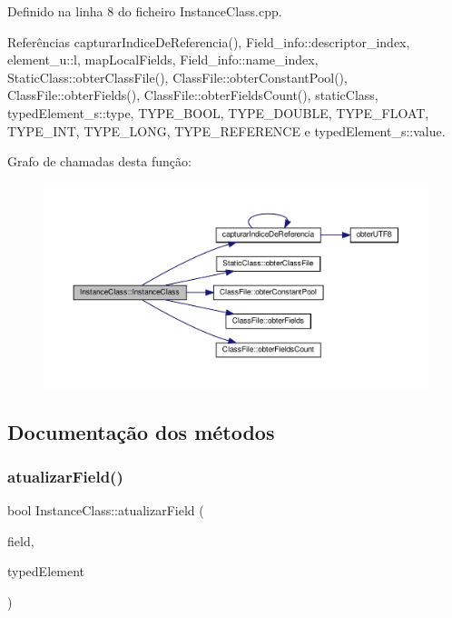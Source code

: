 Definido na linha 8 do ficheiro Instance\+Class.\+cpp.



Referências capturar\+Indice\+De\+Referencia(), Field\+\_\+info\+::descriptor\+\_\+index, element\+\_\+u\+::l, map\+Local\+Fields, Field\+\_\+info\+::name\+\_\+index, Static\+Class\+::obter\+Class\+File(), Class\+File\+::obter\+Constant\+Pool(), Class\+File\+::obter\+Fields(), Class\+File\+::obter\+Fields\+Count(), static\+Class, typed\+Element\+\_\+s\+::type, T\+Y\+P\+E\+\_\+\+B\+O\+OL, T\+Y\+P\+E\+\_\+\+D\+O\+U\+B\+LE, T\+Y\+P\+E\+\_\+\+F\+L\+O\+AT, T\+Y\+P\+E\+\_\+\+I\+NT, T\+Y\+P\+E\+\_\+\+L\+O\+NG, T\+Y\+P\+E\+\_\+\+R\+E\+F\+E\+R\+E\+N\+CE e typed\+Element\+\_\+s\+::value.

Grafo de chamadas desta função\+:
\nopagebreak
\begin{figure}[H]
\begin{center}
\leavevmode
\includegraphics[width=350pt]{classInstanceClass_ac1bee1eb9725e1fec8de7f4cf97f369c_cgraph}
\end{center}
\end{figure}


\subsection{Documentação dos métodos}
\mbox{\label{classInstanceClass_a3af2fc7bfe8f406b5ea6efbf18161514}} 
\subsubsection{\texorpdfstring{atualizar\+Field()}{atualizarField()}}
{\footnotesize\ttfamily bool Instance\+Class\+::atualizar\+Field (\begin{DoxyParamCaption}\item[{string}]{field,  }\item[{\hyperlink{BasicTypes_8h_a97b332303b1262282599e6ede0637b82}{Typed\+Element}}]{typed\+Element }\end{DoxyParamCaption})}



